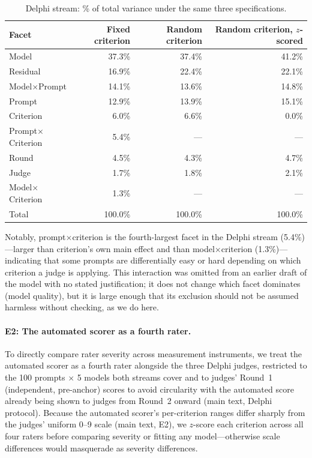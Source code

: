 \documentclass[10pt]{article}
\begin{document}
\begin{table}[H]
\centering
\small
\caption{Delphi stream: \% of total variance under the same three
specifications.}
\label{tab:vc_robustness_delphi}
\begin{tabular}{lrrr}
\toprule
Facet & Fixed criterion & Random criterion & Random criterion, $z$-scored \\
\midrule
Model                     & 37.3\% & 37.4\% & 41.2\% \\
Residual                  & 16.9\% & 22.4\% & 22.1\% \\
Model$\times$Prompt       & 14.1\% & 13.6\% & 14.8\% \\
Prompt                    & 12.9\% & 13.9\% & 15.1\% \\
Criterion                 &  6.0\% &  6.6\% &  0.0\% \\
Prompt$\times$Criterion   &  5.4\% & --- & --- \\
Round                     &  4.5\% &  4.3\% &  4.7\% \\
Judge                     &  1.7\% &  1.8\% &  2.1\% \\
Model$\times$Criterion    &  1.3\% & --- & --- \\
\midrule
Total                     & 100.0\% & 100.0\% & 100.0\% \\
\bottomrule
\end{tabular}
\end{table}

Notably, prompt$\times$criterion is the fourth-largest facet in the Delphi
stream (5.4\%)---larger than criterion's own main effect and than
model$\times$criterion (1.3\%)---indicating that some prompts are
differentially easy or hard depending on which criterion a judge is applying.
This interaction was omitted from an earlier draft of the model with no
stated justification; it does not change which facet dominates (model
quality), but it is large enough that its exclusion should not be assumed
harmless without checking, as we do here.

\paragraph{E2: The automated scorer as a fourth rater.}
To directly compare rater severity across measurement instruments, we treat
the automated scorer as a fourth rater alongside the three Delphi judges,
restricted to the 100 prompts $\times$ 5 models both streams cover and to
judges' Round~1 (independent, pre-anchor) scores to avoid circularity with
the automated score already being shown to judges from Round~2 onward
(main text, Delphi protocol). Because the automated scorer's per-criterion
ranges differ sharply from the judges' uniform 0--9 scale (main text, E2), we
$z$-score each criterion across all four raters before comparing severity
or fitting any model---otherwise scale differences would masquerade as
severity differences.
\end{document}
